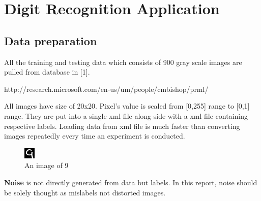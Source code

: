 \documentclass[a4paper, 11pt]{article}
\begin{document}
\section{Digit Recognition Application}
\subsection{Data preparation}
All the training and testing data which consists of 900 gray scale images are pulled from database in [1].
\begin{center}http://research.microsoft.com/en-us/um/people/cmbishop/prml/\end{center}
All images have size of 20x20. Pixel's value is scaled from [0,255] range to [0,1] range. They are put into a single xml file along side with a xml file containing respective labels. Loading data from xml file is much faster than converting images repeatedly every time an experiment is conducted.
\begin{figure}[ht]
  \centering
  \includegraphics[scale=5]{img0014}
  \caption{An image of 9}
  \label{fig:9}
\end{figure}
\textbf{Noise} is not directly generated from data but labels. In this report, noise should be solely thought as mislabels not distorted images.
\end{document}
